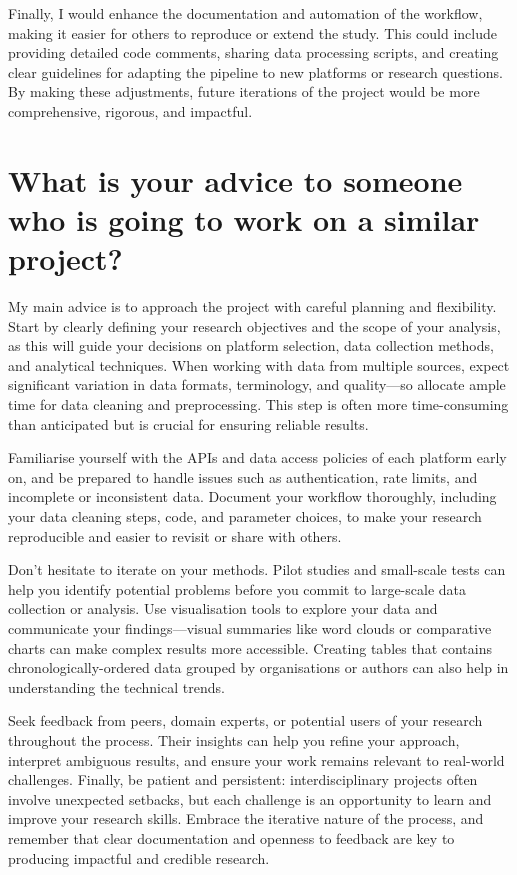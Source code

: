 \documentclass[sigconf, nonacm]{acmart}
\begin{document}
Finally, I would enhance the documentation and automation of the workflow, making it easier for others to reproduce or extend the study. This could include providing detailed code comments, sharing data processing scripts, and creating clear guidelines for adapting the pipeline to new platforms or research questions. By making these adjustments, future iterations of the project would be more comprehensive, rigorous, and impactful.

\section{What is your advice to someone who is going to work on a similar project?}
My main advice is to approach the project with careful planning and flexibility. Start by clearly defining your research objectives and the scope of your analysis, as this will guide your decisions on platform selection, data collection methods, and analytical techniques. When working with data from multiple sources, expect significant variation in data formats, terminology, and quality—so allocate ample time for data cleaning and preprocessing. This step is often more time-consuming than anticipated but is crucial for ensuring reliable results.

Familiarise yourself with the APIs and data access policies of each platform early on, and be prepared to handle issues such as authentication, rate limits, and incomplete or inconsistent data. Document your workflow thoroughly, including your data cleaning steps, code, and parameter choices, to make your research reproducible and easier to revisit or share with others.

Don’t hesitate to iterate on your methods. Pilot studies and small-scale tests can help you identify potential problems before you commit to large-scale data collection or analysis. Use visualisation tools to explore your data and communicate your findings—visual summaries like word clouds or comparative charts can make complex results more accessible. Creating tables that contains chronologically-ordered data grouped by organisations or authors can also help in understanding the technical trends\cite{ObrenovicBojan2025GAah}.

Seek feedback from peers, domain experts, or potential users of your research throughout the process. Their insights can help you refine your approach, interpret ambiguous results, and ensure your work remains relevant to real-world challenges. Finally, be patient and persistent: interdisciplinary projects often involve unexpected setbacks, but each challenge is an opportunity to learn and improve your research skills. Embrace the iterative nature of the process, and remember that clear documentation and openness to feedback are key to producing impactful and credible research.



\end{document}
